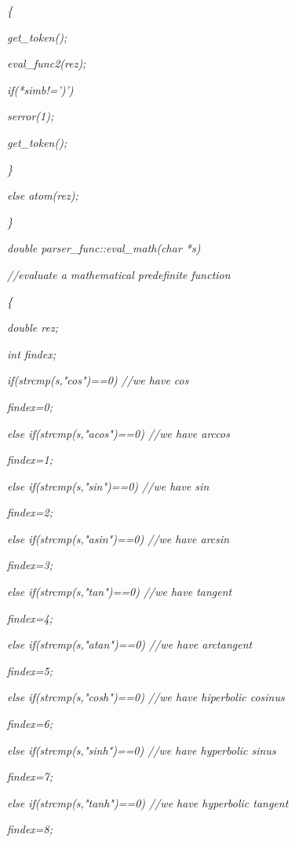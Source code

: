 \documentclass[a4paper,twoside]{book}
\begin{document}
\textit{\qquad \{}

\textit{\qquad \qquad get\_token();}

\textit{\qquad \qquad eval\_func2(rez);}

\textit{\qquad \qquad if(*simb!=')')}

\textit{\qquad \qquad \qquad serror(1);}

\textit{\qquad \qquad get\_token();}

\textit{\qquad \}}

\textit{\qquad else atom(rez);}

\textit{\}}

\textit{double parser\_func::eval\_math(char *s)}

\textit{//evaluate a mathematical predefinite function}

\textit{\{}

\textit{\qquad double rez;}

\textit{\qquad int findex;}

\textit{\qquad if(strcmp(s,"cos")==0) //we have cos}

\textit{\qquad \qquad findex=0;}

\textit{\qquad else if(strcmp(s,"acos")==0) //we have arccos}

\textit{\qquad \qquad findex=1;}

\textit{\qquad else if(strcmp(s,"sin")==0) //we have sin}

\textit{\qquad \qquad findex=2;}

\textit{\qquad else if(strcmp(s,"asin")==0) //we have arcsin}

\textit{\qquad \qquad findex=3;}

\textit{\qquad else if(strcmp(s,"tan")==0) //we have tangent}

\textit{\qquad \qquad findex=4;}

\textit{\qquad else if(strcmp(s,"atan")==0) //we have arctangent}

\textit{\qquad \qquad findex=5;}

\textit{\qquad else if(strcmp(s,"cosh")==0) //we have hiperbolic cosinus }

\textit{\qquad \qquad findex=6;}

\textit{\qquad else if(strcmp(s,"sinh")==0) //we have hyperbolic sinus }

\textit{\qquad \qquad findex=7;}

\textit{\qquad else if(strcmp(s,"tanh")==0) //we have hyperbolic tangent}

\textit{\qquad \qquad findex=8;}
\end{document}
